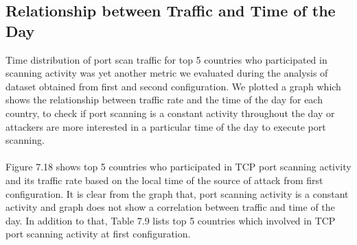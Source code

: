 \subsection{Relationship between Traffic and Time of the Day}
Time distribution of port scan traffic for top 5 countries who participated in scanning activity was yet another metric we evaluated during the analysis of dataset obtained from first and second configuration.
We plotted a graph which shows the relationship between traffic rate and the time of the day for each country, to check if port scanning is a constant activity throughout the day or attackers are more interested in a particular time of the day to execute port scanning.\\\\
Figure 7.18 shows top 5 countries who participated in TCP port scanning activity and its traffic rate based on the local time of the source of attack from first configuration.
It is clear from the graph that, port scanning activity is a constant activity and graph does not show a correlation between traffic and time of the day.
In addition to that, Table 7.9 lists top 5 countries which involved in TCP port scanning activity at first configuration.  
